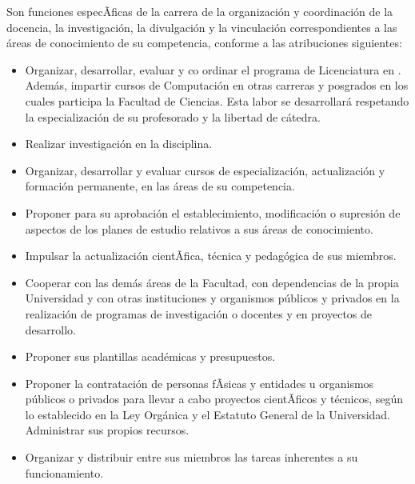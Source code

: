 Son funciones especÃ­ficas de la carrera de \SchoolShortName la organización y coordinación de la docencia, la investigación, la divulgación y la vinculación correspondientes a las áreas de conocimiento de su competencia, conforme a las atribuciones siguientes: 

\begin{itemize}
\item Organizar, desarrollar, evaluar y co ordinar el programa de Licenciatura en \SchoolShortName. Además, impartir cursos de Computación en otras carreras y posgrados en los cuales participa la Facultad de Ciencias. Esta labor se desarrollará respetando la especialización de su profesorado y la libertad de cátedra. 

\item Realizar investigación en la disciplina.

\item Organizar, desarrollar y evaluar cursos de especialización, actualización y formación permanente, en las áreas de su competencia.

\item Proponer para su aprobación el establecimiento, modificación o supresión de aspectos de los planes de estudio relativos a sus áreas de conocimiento.

\item Impulsar la actualización cientÃ­fica, técnica y pedagógica de sus miembros.

\item Cooperar con las demás áreas de la Facultad, con dependencias de la propia Universidad y con otras instituciones y organismos públicos y privados en la realización de programas de investigación o docentes y en proyectos de desarrollo.

\item Proponer sus plantillas académicas y presupuestos.

\item Proponer la contratación de personas fÃ­sicas y entidades u organismos públicos o privados para llevar a cabo proyectos cientÃ­ficos y técnicos, según lo establecido en la Ley Orgánica y el Estatuto General de la Universidad. Administrar sus propios recursos.

\item Organizar y distribuir entre sus miembros las tareas inherentes a su funcionamiento.
\end{itemize}
